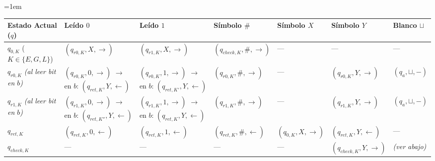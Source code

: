 \vspace{0.3cm}
\begin{center}
\renewcommand{\arraystretch}{1.3}
\scriptsize
\emergencystretch=1em
\begin{tabular}{|p{3cm}|p{2cm}|p{2.5cm}|p{2cm}|p{1.5cm}|p{2cm}|p{1.8cm}|}
\hline
\textbf{Estado Actual ($q$)} & \textbf{Leído $0$} & \textbf{Leído $1$} & \textbf{Símbolo $\#$} & \textbf{Símbolo $X$} & \textbf{Símbolo $Y$} & \textbf{Blanco $\sqcup$} \\ \hline
\textbf{$q_{0, K}$} \newline ($K \in \{E,G,L\}$) & $(q_{r0,K}, X, \to)$ & $(q_{r1,K}, X, \to)$ & $(q_{check,K}, \#, \to)$ & --- & --- & --- \\ \hline
\textbf{$q_{r0, K}$} \newline \textit{(al leer bit en $b$)} & $(q_{r0,K}, 0, \to)$ \newline $\to$ en $b$: \newline $(q_{ret,K}, Y, \leftarrow)$ & $(q_{r0,K}, 1, \to)$ \newline $\to$ en $b$: \newline $(q_{ret, K'}, Y, \leftarrow)$ & $(q_{r0,K}, \#, \to)$ & --- & $(q_{r0,K}, Y, \to)$ & \textbf{$(q_a, \sqcup, -)$} \\ \hline
\textbf{$q_{r1, K}$} \newline \textit{(al leer bit en $b$)} & $(q_{r1,K}, 0, \to)$ \newline $\to$ en $b$: \newline $(q_{ret,K''}, Y, \leftarrow)$ & $(q_{r1,K}, 1, \to)$ \newline $\to$ en $b$: \newline $(q_{ret,K}, Y, \leftarrow)$ & $(q_{r1,K}, \#, \to)$ & --- & $(q_{r1,K}, Y, \to)$ & \textbf{$(q_a, \sqcup, -)$} \\ \hline
\textbf{$q_{ret, K}$} & $(q_{ret,K}, 0, \leftarrow)$ & $(q_{ret,K}, 1, \leftarrow)$ & $(q_{ret,K}, \#, \leftarrow)$ & $(q_{0,K}, X, \to)$ & $(q_{ret,K}, Y, \leftarrow)$ & --- \\ \hline
\textbf{$q_{check, K}$} & --- & --- & --- & --- & $(q_{check,K}, Y, \to)$ & \textit{(ver abajo)} \\ \hline
\end{tabular}
\end{center}
\vspace{0.3cm}

